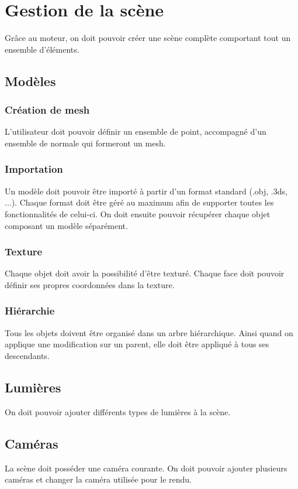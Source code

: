 \documentclass [a4 paper,11pt]{article}
\begin{document}
\section{Gestion de la scène}
Grâce au moteur, on doit pouvoir créer une scène complète comportant tout un ensemble d'éléments.
\subsection{Modèles}

\subsubsection*{Création de mesh}
L'utilisateur doit pouvoir définir un ensemble de point, accompagné d'un ensemble de normale qui formeront un mesh.
\subsubsection*{Importation}
Un modèle doit pouvoir être importé à partir d'un format standard (.obj, .3ds, ...).
Chaque format doit être géré au maximum afin de supporter toutes les fonctionnalités de celui-ci.
On doit ensuite pouvoir récupérer chaque objet composant un modèle séparément.
\subsubsection*{Texture}
Chaque objet doit avoir la possibilité d'être texturé.
Chaque face doit pouvoir définir ses propres coordonnées dans la texture.
\subsubsection*{Hiérarchie}
Tous les objets doivent être organisé dans un arbre hiérarchique.
Ainsi quand on applique une modification sur un parent, elle doit être appliqué à tous ses descendants.

\subsection{Lumières}
On doit pouvoir ajouter différents types de lumières à la scène.

\subsection{Caméras}
La scène doit posséder une caméra courante.
On doit pouvoir ajouter plusieurs caméras et changer la caméra utilisée pour le rendu.
\end{document}
